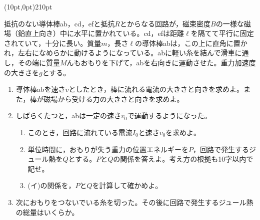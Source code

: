 \hakosyokika
\item
    \begin{mawarikomi}(10pt,0pt){210pt}{
        
    }
    抵抗のない導体棒ab，cd，efと抵抗$R$とからなる回路が，磁束密度$B$の一様な磁場（鉛直上向き）中に水平に置かれている。cd，efは距離$\ell $を隔てて平行に固定されていて，十分に長い。質量$m$，長さ$\ell $の導体棒abは，この上に直角に置かれ，左右になめらかに動けるようになっている。abに軽い糸を結んで滑車に通し，その端に質量$M$んもおもりを下げて，abを右向きに運動させた。重力加速度の大きさを$g$とする。
        \begin{enumerate}
            \item 導体棒abを速さ$v$としたとき，棒に流れる電流の大きさと向きを求めよ。また，棒が磁場から受ける力の大きさと向きを求めよ。
            \item しばらくたつと，abは一定の速さ$v_0$で運動するようになった。
                \begin{enumerate}[(ア)]
                    \item このとき，回路に流れている電流$I_0$と速さ$v_0$を求めよ。
                    \item 単位時間に，おもりが失う重力の位置エネルギーを$P$，回路で発生するジュール熱を$Q$とする。$P$と$Q$の関係を答えよ。考え方の根拠も10字以内で記せ。
                    \item (イ)の関係を，$P$と$Q$を計算して確かめよ。
                \end{enumerate}
            \item 次におもりをつないでいる糸を切った。その後に回路で発生するジュール熱の総量はいくらか。
        \end{enumerate}
    \end{mawarikomi}